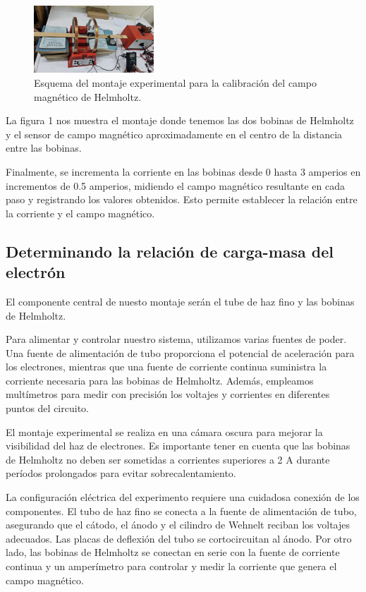 \documentclass[twocolumn,a4paper,11pt]{scrartcl}
\begin{document}
\begin{figure}
    \centering
    \includegraphics[width=0.4\textwidth]{montaje_exp_campo_magnetico.jpg}
    \caption{Esquema del montaje experimental para la calibración del campo magnético de Helmholtz.}
    \label{fig:electron_deflection}
\end{figure}

La figura 1 nos muestra el montaje donde tenemos las dos bobinas de Helmholtz y el sensor de campo magnético aproximadamente en el centro de la distancia entre las bobinas.

Finalmente, se incrementa la corriente en las bobinas desde 0 hasta 3 amperios en incrementos de 0.5 amperios, midiendo el campo magnético resultante en cada paso y registrando los valores obtenidos. Esto permite establecer la relación entre la corriente y el campo magnético.


\subsection*{Determinando la relación de carga-masa del electrón}

El componente central de nuesto montaje serán el tube de haz fino y las bobinas de Helmholtz.

Para alimentar y controlar nuestro sistema, utilizamos varias fuentes de poder. Una fuente de alimentación de tubo proporciona el potencial de aceleración para los electrones, mientras que una fuente de corriente continua suministra la corriente necesaria para las bobinas de Helmholtz. Además, empleamos multímetros para medir con precisión los voltajes y corrientes en diferentes puntos del circuito.

El montaje experimental se realiza en una cámara oscura para mejorar la visibilidad del haz de electrones. Es importante tener en cuenta que las bobinas de Helmholtz no deben ser sometidas a corrientes superiores a 2 A durante períodos prolongados para evitar sobrecalentamiento.

La configuración eléctrica del experimento requiere una cuidadosa conexión de los componentes. El tubo de haz fino se conecta a la fuente de alimentación de tubo, asegurando que el cátodo, el ánodo y el cilindro de Wehnelt reciban los voltajes adecuados. Las placas de deflexión del tubo se cortocircuitan al ánodo. Por otro lado, las bobinas de Helmholtz se conectan en serie con la fuente de corriente continua y un amperímetro para controlar y medir la corriente que genera el campo magnético.
\end{document}
